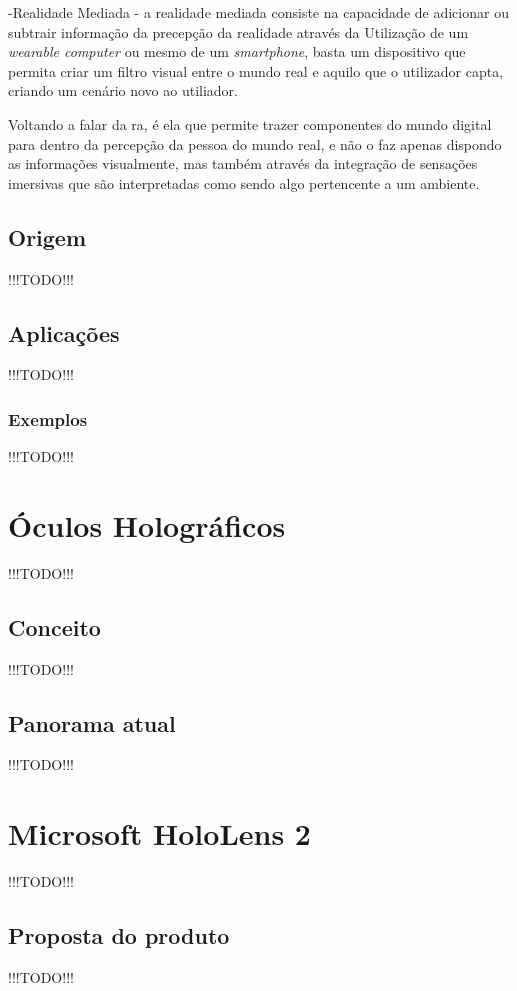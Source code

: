 \documentclass{report}
\begin{document}
-Realidade Mediada - a realidade mediada consiste na capacidade de adicionar ou subtrair informação da precepção da realidade através da Utilização de um \textit{wearable computer} ou mesmo de um \textit{smartphone}, basta um dispositivo que permita criar um filtro visual entre o mundo real e aquilo que o utilizador capta, criando um cenário novo ao utiliador.

Voltando a falar da \ac{ra}, é ela que permite trazer componentes do mundo digital para dentro da percepção da pessoa do mundo real, e não o faz apenas dispondo as informações visualmente, mas também através da integração de sensações imersivas que são interpretadas como sendo algo pertencente a um ambiente.

\section{Origem}
!!!TODO!!!

\section{Aplicações}
!!!TODO!!!

\subsection{Exemplos}
!!!TODO!!!

\chapter{Óculos Holográficos}
\label{chap.oculos-holograficos}
!!!TODO!!!

\section{Conceito}
!!!TODO!!!

\section{Panorama atual}
!!!TODO!!!

\chapter{Microsoft HoloLens 2}
\label{chap.microsoft-hololens-2}
!!!TODO!!!

\section{Proposta do produto}
!!!TODO!!!
\end{document}
